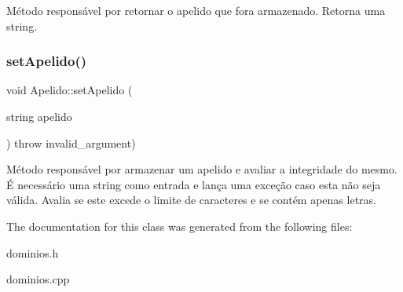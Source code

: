 Método responsável por retornar o apelido que fora armazenado. Retorna uma string. \mbox{\label{classApelido_a2cb01229e3c1120858ef6c1f692432da}} 
\subsubsection{\texorpdfstring{set\+Apelido()}{setApelido()}}
{\footnotesize\ttfamily void Apelido\+::set\+Apelido (\begin{DoxyParamCaption}\item[{string}]{apelido }\end{DoxyParamCaption}) throw  invalid\+\_\+argument) }

Método responsável por armazenar um apelido e avaliar a integridade do mesmo. É necessário uma string como entrada e lança uma exceção caso esta não seja válida. Avalia se este excede o limite de caracteres e se contém apenas letras. 

The documentation for this class was generated from the following files\+:\begin{DoxyCompactItemize}
\item 
dominios.\+h\item 
dominios.\+cpp\end{DoxyCompactItemize}
